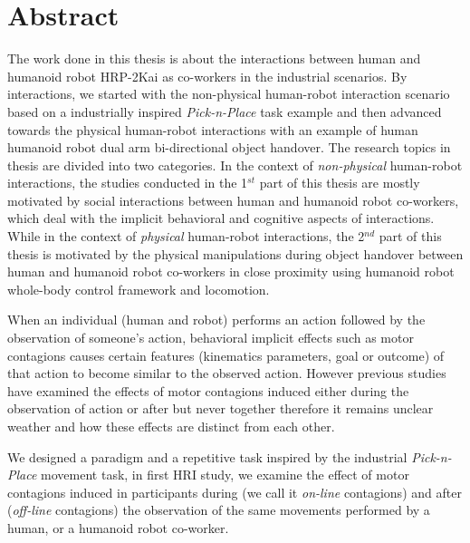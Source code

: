 {\color{blue}\chapter*{Abstract}}
\thispagestyle{empty}



The work done in this thesis is about the interactions between human and humanoid robot HRP-2Kai as co-workers in the industrial scenarios. By interactions, we started with the non-physical human-robot interaction scenario based on a industrially inspired \textit{Pick-n-Place} task example and then advanced towards the physical human-robot interactions with an example of human humanoid robot dual arm bi-directional object handover. The research topics in thesis are divided into two categories. In the context of \textit{non-physical} human-robot interactions, the studies conducted in the 1$^{st}$ part of this thesis are mostly motivated by social interactions between human and humanoid robot co-workers, which deal with the implicit behavioral and cognitive aspects of interactions. While in the context of \textit{physical} human-robot interactions, the 2$^{nd}$ part of this thesis is motivated by the physical manipulations during object handover between human and humanoid robot co-workers in close proximity using humanoid robot whole-body control framework and locomotion.


When an individual (human and robot) performs an action followed by the observation of someone's action, behavioral implicit effects such as motor contagions causes certain features (kinematics parameters, goal or outcome) of that action to become similar to the observed action. However previous studies have examined the effects of motor contagions induced either during the observation of action or after but never together therefore it remains unclear weather and how these effects are distinct from each other.

We designed a paradigm and a repetitive task inspired by the industrial \textit{Pick-n-Place} movement task, in first HRI study, we examine the effect of motor contagions induced in participants during (we call it \textit{on-line} contagions) and after (\textit{off-line} contagions) the observation of the same movements performed by a human, or a humanoid robot co-worker.

